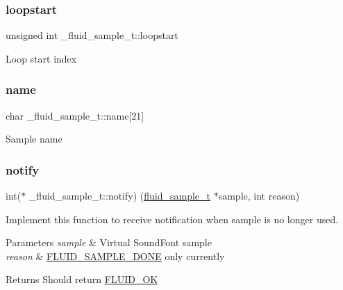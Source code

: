 \subsubsection{\texorpdfstring{loopstart}{loopstart}}
{\footnotesize\ttfamily unsigned int \+\_\+fluid\+\_\+sample\+\_\+t\+::loopstart}

Loop start index \mbox{\label{struct__fluid__sample__t_a054c9821ce07e9c680331bfc29cf7a1f}} 
\subsubsection{\texorpdfstring{name}{name}}
{\footnotesize\ttfamily char \+\_\+fluid\+\_\+sample\+\_\+t\+::name\mbox{[}21\mbox{]}}

Sample name \mbox{\label{struct__fluid__sample__t_ad43c2d0777a885a54e1dd3462ded025e}} 
\subsubsection{\texorpdfstring{notify}{notify}}
{\footnotesize\ttfamily int($\ast$ \+\_\+fluid\+\_\+sample\+\_\+t\+::notify) (\hyperlink{types_8h_abf9174d452679ca1a4ee7d693fb773cf}{fluid\+\_\+sample\+\_\+t} $\ast$sample, int reason)}

Implement this function to receive notification when sample is no longer used. 
\begin{DoxyParams}{Parameters}
{\em sample} & Virtual Sound\+Font sample \\
\hline
{\em reason} & \hyperlink{sfont_8h_a06fc87d81c62e9abb8790b6e5713c55bad5841d407c7bcd3b59b787de8d506a7c}{F\+L\+U\+I\+D\+\_\+\+S\+A\+M\+P\+L\+E\+\_\+\+D\+O\+NE} only currently \\
\hline
\end{DoxyParams}
\begin{DoxyReturn}{Returns}
Should return \hyperlink{misc_8h_ae4efb1c3ce0d550c922504adfb0fb886}{F\+L\+U\+I\+D\+\_\+\+OK} 
\end{DoxyReturn}
\mbox{\label{struct__fluid__sample__t_a1a2bb5f13ed47a3e59b650f9f0cf4bf9}} 

